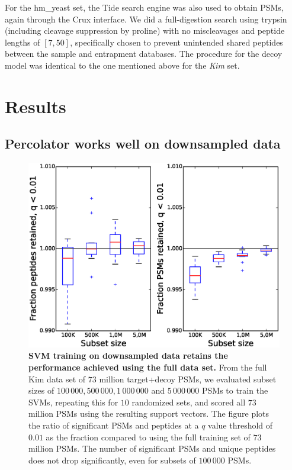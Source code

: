 \documentclass{article}
\begin{document}
For the hm\_yeast set, the Tide search engine was also used to obtain
PSMs, again through the Crux interface. We did a full-digestion search
using trypsin (including cleavage suppression by proline) with no
miscleavages and peptide lengths of $[7,50]$, specifically chosen to
prevent unintended shared peptides between the sample and entrapment
databases. The procedure for the decoy model was identical to the one 
mentioned above for the {\em Kim} set.

\section*{Results}

\subsection*{Percolator works well on downsampled data}

\begin{figure}
\begin{center}
\includegraphics[width=0.6\linewidth]{./img/subset-performance}
\caption{\label{fig:subset}\textbf{SVM training on downsampled data
    retains the performance achieved using the full data set.}  From
  the full Kim data set of $73$ million target+decoy PSMs, we
  evaluated subset sizes of $100\,000, 500\,000, 1\,000\,000$ and
  $5\,000\,000$ PSMs to train the SVMs, repeating this for $10$
  randomized sets, and scored all $73$ million PSMs using the
  resulting support vectors. The figure plots the ratio of significant PSMs
  and peptides at a $q$ value threshold of $0.01$ as the fraction
  compared to using the full training set of $73$ million PSMs. The
  number of significant PSMs and unique peptides does not drop
  significantly, even for subsets of $100\,000$ PSMs.}
\end{center}
\end{figure}
\end{document}
